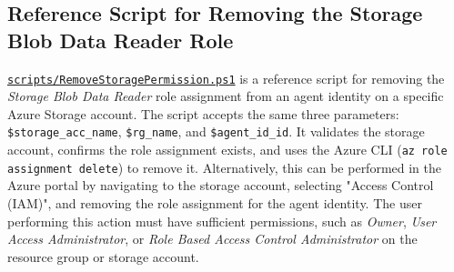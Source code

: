 \documentclass[9pt]{extarticle}%
\begin{document}
\subsection{Reference Script for Removing the Storage Blob Data Reader Role}%
\href{https://github.com/dennisseah/agent-identity/blob/main/scripts/RemoveStoragePermission.ps1}{\texttt{scripts/RemoveStoragePermission.ps1}} is a reference script for removing the \textit{Storage Blob Data Reader} role assignment from an agent identity on a specific Azure Storage account. The script accepts the same three parameters: \texttt{\$storage\_acc\_name}, \texttt{\$rg\_name}, and \texttt{\$agent\_id\_id}. It validates the storage account, confirms the role assignment exists, and uses the Azure CLI (\texttt{az role assignment delete}) to remove it. Alternatively, this can be performed in the Azure portal by navigating to the storage account, selecting "Access Control (IAM)", and removing the role assignment for the agent identity. The user performing this action must have sufficient permissions, such as \textit{Owner}, \textit{User Access Administrator}, or \textit{Role Based Access Control Administrator} on the resource group or storage account.
%
\par\vspace{\baselineskip}%
\end{document}
